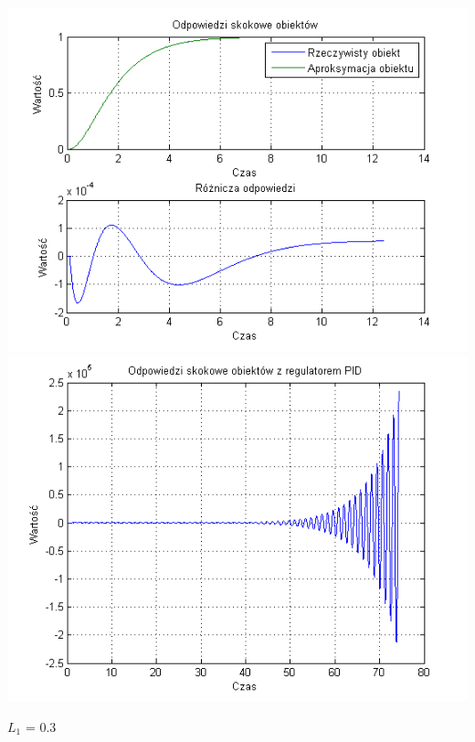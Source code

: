 \documentclass[10pt,a4paper]{article}
\begin{document}
\begin{center}
\includegraphics[scale=1]{images/dwa/skrypt_159.png}\\
\includegraphics[scale=1]{images/dwa/skrypt_160.png}\\
\end{center}
\newpage
$L_1$ = 0.3
\end{document}
